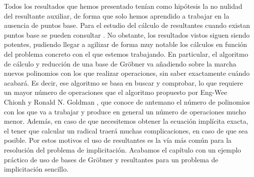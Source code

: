 Todos los resultados que hemos presentado tenían como hipótesis la no nulidad del resultante auxiliar, de forma que solo hemos aprendido a trabajar en la ausencia de puntos base. Para el estudio del cálculo de resultantes cuando existan puntos base se pueden consultar \cite{base1, base2}. No obstante, los resultados vistos siguen siendo potentes, pudiendo llegar a agilizar de forma muy notable los cálculos en función del problema concreto con el que estemos trabajando. En particular, el algoritmo de cálculo y reducción de una base de Gröbner va añadiendo sobre la marcha nuevos polinomios con los que realizar operaciones, sin saber exactamente cuándo acabará. Es decir, ese algoritmo se basa en buscar y comprobar, lo que requiere un mayor número de operaciones que el algoritmo propuesto por Eng-Wee Chionh y Ronald N. Goldman \cite{res1}, que conoce de antemano el número de polinomios con los que va a trabajar y produce en general un número de operaciones mucho menor. Además, en caso de que necesitemos obtener la ecuación implícita exacta, el tener que calcular un radical traerá muchas complicaciones, en caso de que sea posible. Por estos motivos el uso de resultantes es la vía más común para la resolución del problema de implicitación. Acabamos el capítulo con un ejemplo práctico de uso de bases de Gröbner y resultantes para un problema de implicitación sencillo.
